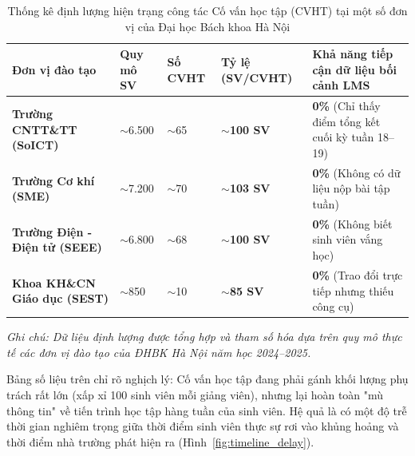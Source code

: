 \begin{table}[htbp]
\centering
\caption{Thống kê định lượng hiện trạng công tác Cố vấn học tập (CVHT) tại một số đơn vị của Đại học Bách khoa Hà Nội}
\label{tab:tai_cvht}
\vspace{0.2cm}
\begin{tabularx}{\textwidth}{|L{3.0cm}|C{1.8cm}|C{1.8cm}|C{1.8cm}|Y|}
\hline
\textbf{Đơn vị đào tạo} & \textbf{Quy mô SV} & \textbf{Số CVHT} & \textbf{Tỷ lệ (SV/CVHT)} & \textbf{Khả năng tiếp cận dữ liệu bối cảnh LMS} \\
\hline
\textbf{Trường CNTT\&TT (SoICT)} & $\sim$6.500 & $\sim$65 & \textbf{$\sim$100 SV} & \textbf{0\%} (Chỉ thấy điểm tổng kết cuối kỳ tuần 18--19) \\
\hline
\textbf{Trường Cơ khí (SME)} & $\sim$7.200 & $\sim$70 & \textbf{$\sim$103 SV} & \textbf{0\%} (Không có dữ liệu nộp bài tập tuần) \\
\hline
\textbf{Trường Điện - Điện tử (SEEE)} & $\sim$6.800 & $\sim$68 & \textbf{$\sim$100 SV} & \textbf{0\%} (Không biết sinh viên vắng học) \\
\hline
\textbf{Khoa KH\&CN Giáo dục (SEST)} & $\sim$850 & $\sim$10 & \textbf{$\sim$85 SV} & \textbf{0\%} (Trao đổi trực tiếp nhưng thiếu công cụ) \\
\hline
\end{tabularx}
\begin{flushleft}
\textit{\fontsize{8}{10}\selectfont Ghi chú: Dữ liệu định lượng được tổng hợp và tham số hóa dựa trên quy mô thực tế các đơn vị đào tạo của ĐHBK Hà Nội năm học 2024--2025.}
\end{flushleft}
\end{table}

Bảng số liệu trên chỉ rõ nghịch lý: Cố vấn học tập đang phải gánh khối lượng phụ trách rất lớn (xấp xỉ 100 sinh viên mỗi giảng viên), nhưng lại hoàn toàn "mù thông tin" về tiến trình học tập hàng tuần của sinh viên. Hệ quả là có một độ trễ thời gian nghiêm trọng giữa thời điểm sinh viên thực sự rơi vào khủng hoảng và thời điểm nhà trường phát hiện ra (Hình~\ref{fig:timeline_delay}).

